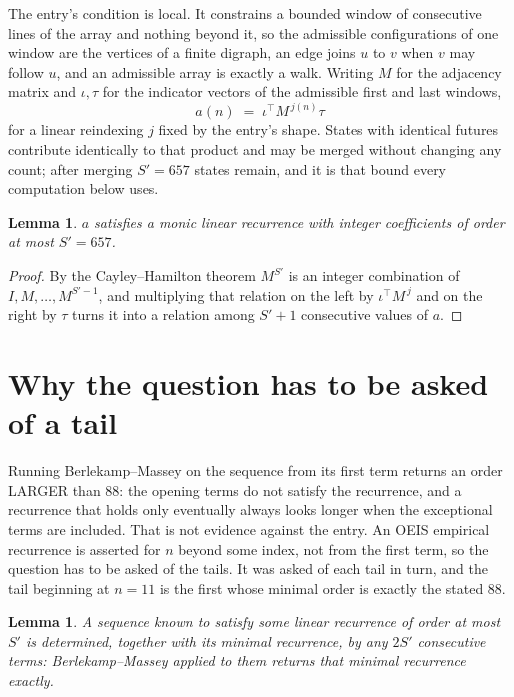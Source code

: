 \documentclass[11pt,a4paper]{article}
\theoremstyle{plain}
\newtheorem{lemma}[theorem]{Lemma}
\theoremstyle{definition}
\begin{document}
The entry's condition is local. It constrains a bounded window of consecutive lines of the
array and nothing beyond it, so the admissible configurations of one window are the vertices of
a finite digraph, an edge joins $u$ to $v$ when $v$ may follow $u$, and an admissible array is
exactly a walk. Writing $M$ for the adjacency matrix and $\iota,\tau$ for the indicator vectors
of the admissible first and last windows,
\[
a(n)\;=\;\iota^{\!\top}M^{\,j(n)}\tau
\]
for a linear reindexing $j$ fixed by the entry's shape. States with identical futures
contribute identically to that product and may be merged without changing any count; after
merging $S'=657$ states remain, and it is that bound every computation below uses.

\begin{lemma}\label{lem:cf}
$a$ satisfies a monic linear recurrence with integer coefficients of order at most $S'=657$.
\end{lemma}

\begin{proof}
By the Cayley--Hamilton theorem $M^{S'}$ is an integer combination of $I,M,\dots,M^{S'-1}$,
and multiplying that relation on the left by $\iota^{\!\top}M^{\,j}$ and on the right by
$\tau$ turns it into a relation among $S'+1$ consecutive values of $a$.
\end{proof}

\section{Why the question has to be asked of a tail}

Running Berlekamp--Massey on the sequence from its first term returns an order LARGER than $88$: the opening terms do not satisfy the recurrence, and a recurrence that holds only eventually always looks longer when the exceptional terms are included. That is not evidence against the entry. An OEIS empirical recurrence is asserted for $n$ beyond some index, not from the first term, so the question has to be asked of the tails. It was asked of each tail in turn, and the tail beginning at $n=11$ is the first whose minimal order is exactly the stated $88$.

\begin{lemma}\label{lem:bm}
A sequence known to satisfy some linear recurrence of order at most $S'$ is determined,
together with its minimal recurrence, by any $2S'$ consecutive terms: Berlekamp--Massey applied
to them returns that minimal recurrence exactly.
\end{lemma}
\end{document}
